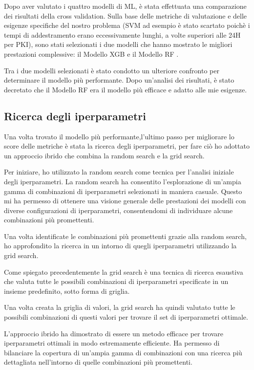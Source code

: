 \begin{flushleft}
Dopo aver valutato i quattro modelli di ML, è stata effettuata una comparazione dei  risultati della cross validation. Sulla base delle metriche di valutazione e delle esigenze specifiche del nostro problema (SVM ad esempio è stato scartato poichè i tempi di addestramento erano eccessivamente lunghi, a volte superiori alle 24H per PKI), sono stati selezionati i due modelli che hanno mostrato le migliori prestazioni complessive:  il Modello XGB e il Modello RF .

Tra i due modelli selezionati è stato condotto un ulteriore confronto per determinare il modello più performante. Dopo un'analisi dei risultati, è stato decretato che il Modello RF era il modello più efficace e adatto alle mie esigenze.


\subsection{Ricerca degli iperparametri}
Una volta trovato il modello più performante,l'ultimo passo per migliorare lo score delle metriche è stata la ricerca degli iperparametri, per fare ciò ho adottato un approccio ibrido che combina la random search e la grid search.

Per iniziare, ho utilizzato la random search come tecnica per l'analisi iniziale degli iperparametri. La random search ha consentito l'esplorazione di un'ampia gamma di combinazioni di iperparametri selezionati in maniera casuale. Questo mi ha permesso di ottenere una visione generale delle prestazioni dei modelli con diverse configurazioni di iperparametri, consentendomi di individuare alcune combinazioni più promettenti.

Una volta identificate le combinazioni più promettenti grazie alla random search, ho approfondito la ricerca in un intorno di quegli iperparametri utilizzando la grid search. 

Come spiegato precedentemente la grid search è una tecnica di ricerca esaustiva che valuta tutte le possibili combinazioni di iperparametri specificate in un insieme predefinito, sotto forma di griglia.

Una volta creata la griglia di valori, la grid search ha quindi valutato tutte le possibili combinazioni di questi valori per trovare il set di iperparametri ottimale.

L'approccio ibrido ha dimostrato di essere un metodo efficace per trovare iperparametri ottimali in modo estremamente efficiente. 
Ha permesso di bilanciare la copertura di un'ampia gamma di combinazioni con una ricerca più dettagliata nell'intorno di quelle combinazioni più promettenti.


\end{flushleft}
